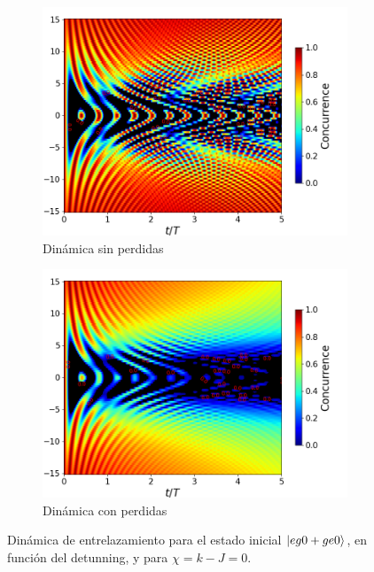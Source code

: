 \begin{figure}[h]
    \centering
    \begin{subfigure}{0.49\textwidth}
        \includegraphics[width=\textwidth]{figuras/ch4/concu/delta/eg1+ge1 k=0.0g x=0.0g J=0.0g gamma=0.25g concu delta uni.png}
        \caption{Dinámica sin perdidas}
        \label{fig4:concu detunning 1 uni}
    \end{subfigure}
    \hfill
    \begin{subfigure}{0.49\textwidth}
        \includegraphics[width=\textwidth]{figuras/ch4/concu/delta/eg1+ge1 k=0.0g x=0.0g J=0.0g gamma=0.25g concu delta dis.png}
        \caption{Dinámica con perdidas}
        \label{fig4:concu detunning 1 dis}
    \end{subfigure}
    \caption{Dinámica de entrelazamiento para el estado inicial $\ket{eg0+ge0}$, en función del detunning, y para $\chi=k-J=0$.}
    \label{fig4:concu detunning 1}
\end{figure}

